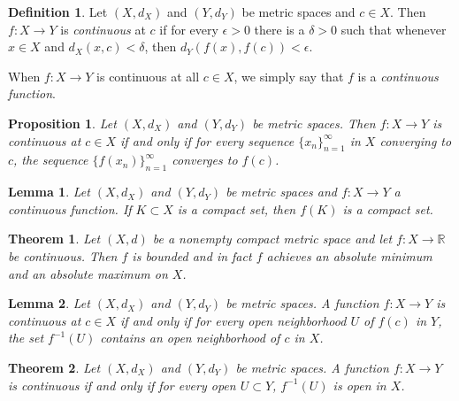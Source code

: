 \documentclass{article}
\newtheorem{theorem}{Theorem}[section]
\newtheorem{lemma}{Lemma}[section]
\newtheorem{proposition}{Proposition}[section]
\theoremstyle{definition}
\newtheorem{definition}{Definition}[section]
\theoremstyle{remark}
\begin{document}
\begin{definition} \label{def:continuous_function}
Let \( (X, d_X) \) and \( (Y, d_Y) \) be metric spaces and \( c \in X \). Then \( f: X \to Y \) is \textit{continuous} at \( c \) if for every \( \epsilon > 0 \) there is a \( \delta > 0 \) such that whenever \( x \in X \) and \( d_X(x, c) < \delta \), then \( d_Y(f(x), f(c)) < \epsilon \).

When \( f: X \to Y \) is continuous at all \( c \in X \), we simply say that \( f \) is a \textit{continuous function}.
\end{definition}

\begin{proposition} \label{prop:continuity_sequence}
Let \( (X, d_X) \) and \( (Y, d_Y) \) be metric spaces. Then \( f: X \to Y \) is continuous at \( c \in X \) if and only if for every sequence \( \{x_n\}_{n=1}^{\infty} \) in \( X \) converging to \( c \), the sequence \( \{f(x_n)\}_{n=1}^{\infty} \) converges to \( f(c) \).
\end{proposition}

\begin{lemma} \label{lem:continuous_compact}
Let \( (X, d_X) \) and \( (Y, d_Y) \) be metric spaces and \( f: X \to Y \) a continuous function. If \( K \subset X \) is a compact set, then \( f(K) \) is a compact set.
\end{lemma}

\begin{theorem} \label{thm:max_min_compact}
Let \( (X, d) \) be a nonempty compact metric space and let \( f: X \to \mathbb{R} \) be continuous. Then \( f \) is bounded and in fact \( f \) achieves an absolute minimum and an absolute maximum on \( X \).

\end{theorem}

\begin{lemma} \label{lem:continuity_neighborhood}
Let \( (X, d_X) \) and \( (Y, d_Y) \) be metric spaces. A function \( f: X \to Y \) is continuous at \( c \in X \) if and only if for every open neighborhood \( U \) of \( f(c) \) in \( Y \), the set \( f^{-1}(U) \) contains an open neighborhood of \( c \) in \( X \).
\end{lemma}

\begin{theorem} \label{thm:continuity_open_sets}
Let \( (X, d_X) \) and \( (Y, d_Y) \) be metric spaces. A function \( f: X \to Y \) is continuous if and only if for every open \( U \subset Y \), \( f^{-1}(U) \) is open in \( X \).
\end{theorem}
\end{document}
